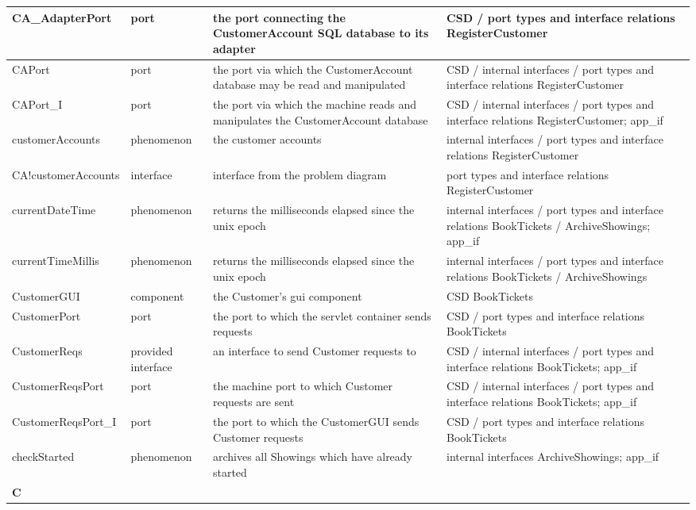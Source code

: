 \documentclass[a4paper,10pt,titlepage,bibtotoc,bibtotocnumbered]{scrreprt}
\begin{document}
\begin{longtable}{|p{.4\linewidth}|p{.2\linewidth}|p{.2\linewidth}|p{.2\linewidth}|}
\hline
CA\_AdapterPort & port & the port connecting the CustomerAccount SQL database to its adapter & CSD / port types and interface relations RegisterCustomer\\
\hline
CAPort & port & the port via which the CustomerAccount database may be read and manipulated & CSD / internal interfaces / port types and interface relations RegisterCustomer\\
\hline
CAPort\_I & port & the port via which the machine reads and manipulates the CustomerAccount database & CSD / internal interfaces / port types and interface relations RegisterCustomer; app\_if\\
\hline
customerAccounts & phenomenon & the customer accounts & internal interfaces / port types and interface relations RegisterCustomer\\
\hline
CA!{customerAccounts} & interface & interface from the problem diagram & port types and interface relations RegisterCustomer\\
\hline
currentDateTime & phenomenon & returns the milliseconds elapsed since the unix epoch & internal interfaces / port types and interface relations BookTickets / ArchiveShowings; app\_if\\
\hline
currentTimeMillis & phenomenon & returns the milliseconds elapsed since the unix epoch & internal interfaces / port types and interface relations BookTickets / ArchiveShowings\\
\hline
CustomerGUI & component & the Customer's gui component & CSD BookTickets\\
\hline
CustomerPort & port & the port to which the servlet container sends requests & CSD / port types and interface relations BookTickets\\
\hline
CustomerReqs & provided interface & an interface to send Customer requests to & CSD / internal interfaces / port types and interface relations BookTickets; app\_if\\
\hline
CustomerReqsPort & port & the machine port to which Customer requests are sent & CSD / internal interfaces / port types and interface relations BookTickets; app\_if\\
\hline
CustomerReqsPort\_I & port & the port to which the CustomerGUI sends Customer requests & CSD / port types and interface relations BookTickets\\
\hline
checkStarted & phenomenon & archives all Showings which have already started & internal interfaces ArchiveShowings; app\_if\\
\hline
\multicolumn{4}{|l|}{\textbf{C}}\\

\end{longtable}
\end{document}
